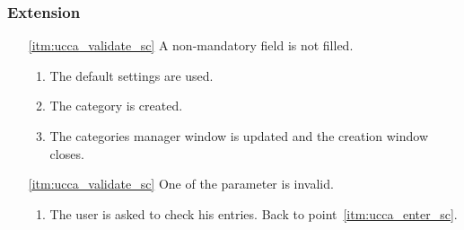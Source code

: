 \subsubsection{Extension}
\begin{enumerate}
	\item[\ref{itm:ucca_validate_sc}] A non-mandatory field is not filled.
	\begin{enumerate}[i]
		\item The default settings are used. 
		\item The category is created.
		\item The categories manager window is updated and the creation window closes.
	\end{enumerate}
	
	\item[\ref{itm:ucca_validate_sc}] One of the parameter is invalid.
	\begin{enumerate}[i]
		\item The user is asked to check his entries. Back to point~\ref{itm:ucca_enter_sc}.
	\end{enumerate}
\end{enumerate}
